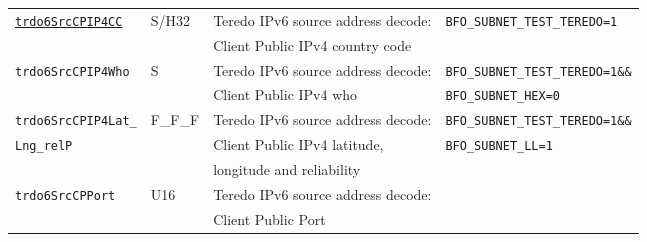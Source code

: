 \documentclass[documentation]{subfiles}
\begin{document}
\begin{longtable}{llll}
    {\tt \hyperref[subnet]{trdo6SrcCPIP4CC}}  & S/H32   & Teredo IPv6 source address decode:     & {\tt\small BFO\_SUBNET\_TEST\_TEREDO=1}\\
                                              &         & \qquad Client Public IPv4 country code & \\
    {\tt trdo6SrcCPIP4Who}                    & S       & Teredo IPv6 source address decode:     & {\tt\small BFO\_SUBNET\_TEST\_TEREDO=1\&\&}\\
                                              &         & \qquad Client Public IPv4 who          & {\tt\small BFO\_SUBNET\_HEX=0}\\
    {\tt trdo6SrcCPIP4Lat\_}                  & F\_F\_F & Teredo IPv6 source address decode:     & {\tt\small BFO\_SUBNET\_TEST\_TEREDO=1\&\&}\\
    {\tt \qquad Lng\_relP}                    &         & \qquad Client Public IPv4 latitude,    & {\tt\small BFO\_SUBNET\_LL=1}\\
                                              &         & \qquad\qquad longitude and reliability & \\
    {\tt trdo6SrcCPPort}                      & U16     & Teredo IPv6 source address decode:     & \\
                                              &         & \qquad Client Public Port              & \\


\end{longtable}
\end{document}
